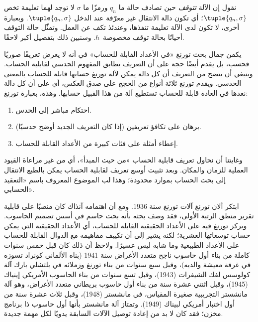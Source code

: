 \documentclass[../../../include/open-logic-section]{subfiles}
\begin{document}
\begin{explain}
نقول إن الآلة \emph{تتوقف} حين تصادف حالة ما $q_n$ ورمزًا ما
$\sigma$ لا توجد لهما تعليمة تخص $\tuple{q_n,\sigma}$؛ أي تكون دالة
الانتقال غير معرّفة عند الدخل $\tuple{q_n,\sigma}$. وبعبارة أخرى، لا
تكون لدى الآلة تعليمة تنفذها، وعندئذ تكف عن العمل. وتمثّل حالة التوقف
أحيانًا بحالة توقف مخصوصة~$h$. وسنبين ذلك بتفصيل أكبر لاحقًا.
\end{explain}

\begin{digress}
يكمن جمال بحث تورنغ «في الأعداد القابلة للحساب» في أنه لا يعرض
تعريفًا صوريًا فحسب، بل يقدم أيضًا حجة على أن التعريف يطابق المفهوم
الحدسي لقابلية الحساب. وينبغي أن يتضح من التعريف أن كل دالة يمكن
لآلة تورنغ حسابها قابلة للحساب بالمعنى الحدسي. ويقدم تورنغ ثلاثة
أنواع من الحجج على صدق العكس، أي على أن كل دالة نعدها في العادة
قابلة للحساب تستطيع آلة من هذا القبيل حسابها. وهذه، بعبارة تورنغ:
\begin{enumerate}
\item احتكام مباشر إلى الحدس.
\item برهان على تكافؤ تعريفين (إذا كان التعريف الجديد أوضح حدسيًا).
\item إعطاء أمثلة على فئات كبيرة من الأعداد القابلة للحساب.
\end{enumerate}
وغايتنا أن نحاول تعريف قابلية الحساب «من حيث المبدأ»، أي من غير
مراعاة القيود العملية للزمان والمكان. وبعد تثبيت أوسع تعريف لقابلية
الحساب يمكن بالطبع الانتقال إلى بحث الحساب بموارد محدودة؛ وهذا لب
الموضوع المعروف باسم «التعقيد الحسابي».
\end{digress}

\begin{history}
ابتكر آلان تورنغ آلات تورنغ سنة 1936. ومع أن اهتمامه آنذاك كان منصبًا
على قابلية تقرير منطق الرتبة الأولى، فقد وصف بحثه بأنه بحث حاسم في
أسس تصميم الحاسوب. ويركز تورنغ فيه على الأعداد الحقيقية القابلة
للحساب، أي الأعداد الحقيقية التي يمكن حساب توسعاتها العشرية؛ لكنه
يشير إلى أن تكييف مفاهيمه مع الدوال القابلة للحساب على الأعداد
الطبيعية وما شابه ليس عسيرًا. ولاحظ أن ذلك كان قبل خمس سنوات كاملة
من بناء أول حاسوب ناجح متعدد الأغراض سنة 1941 (بناه الألماني كونراد
تسوزه في غرفة معيشة والديه)، وقبل سبع سنوات من بناء تورنغ وزملائه في
بلتشلي بارك آلة كولوسس لفك الشيفرات (1943)، وقبل تسع سنوات من بناء
الحاسوب الأمريكي إينياك (1945)، وقبل اثنتي عشرة سنة من بناء أول
حاسوب بريطاني متعدد الأغراض، وهو آلة مانشستر التجريبية صغيرة المقياس،
في مانشستر (1948)، وقبل ثلاث عشرة سنة من أول اختبار أمريكي لبيناك
(1949). وتمتاز آلة مانشستر بأنها أول حاسوب ذا برنامج مخزن؛ فقد كان
لا بد من إعادة توصيل الآلات السابقة يدويًا لكل مهمة جديدة.
\end{history}
\end{document}
